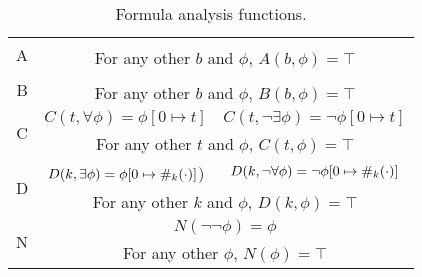 \begin{table}
  \centering
  \begin{tabular}{|c|cc|}
    \hline
    \multirow{2}{*}{A} &  &  \\ \cline{2-3} 
                       & \multicolumn{2}{c|}{For any other $b$ and $\phi$, $A(b,\phi) = \top$} \\ \hline
    \multirow{2}{*}{B} &  &  \\ \cline{2-3} 
                       & \multicolumn{2}{c|}{For any other $b$ and $\phi$, $B(b,\phi) = \top$} \\ \hline
    \multirow{2}{*}{C} & $C(t, \forall \phi) = \phi [0 \mapsto t]$ & $C(t, \lnot \exists \phi) = \lnot \phi [0 \mapsto t]$ \\ \cline{2-3} 
                       & \multicolumn{2}{c|}{For any other $t$ and $\phi$, $C(t,\phi) = \top$} \\ \hline
    \multirow{2}{*}{D} & $D(k, \exists \phi) = \phi [0 \mapsto \#_{k}(\cdot)]$) & $D(k, \lnot \forall \phi) = \lnot \phi [0 \mapsto \#_{k}(\cdot)]$ \\ \cline{2-3} 
                       & \multicolumn{2}{c|}{For any other $k$ and $\phi$, $D(k,\phi) = \top$} \\ \hline
    \multirow{2}{*}{N} & \multicolumn{2}{c|}{$N(\lnot \lnot \phi) = \phi$} \\ \cline{2-3} 
                       & \multicolumn{2}{c|}{For any other $\phi$, $N(\phi) = \top$} \\ \hline
  \end{tabular}
  \caption{Formula analysis functions.}
  \label{tab:analysis}
\end{table}